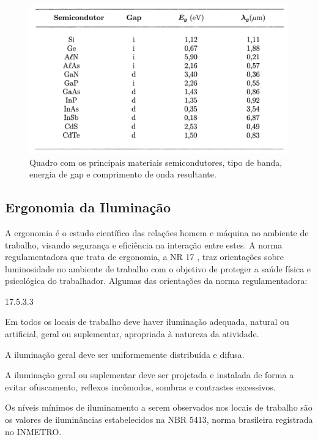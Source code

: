 
\begin{figure}[ht]
    \begin{center}
    \includegraphics{figuras/semic.PNG}
    \end{center}
    \caption[Quadro de energias de gap e comprimentos de onda.]{Quadro com os principais materiais semicondutores, tipo de banda, energia de gap e comprimento de onda resultante.}
    \label{semicon}
\end{figure}

\subsection{Ergonomia da Iluminação}

A ergonomia é o estudo científico das relações homem e máquina no ambiente de trabalho, visando segurança e eficiência na interação entre estes. A norma regulamentadora que trata de ergonomia, a NR 17 \cite{norma}, traz orientações sobre luminosidade no ambiente de trabalho com o objetivo de proteger a saúde física e psicológica do trabalhador. Algumas das orientações da norma regulamentadora:

\begin{labeling}{17.5.3.3}
    \item[17.5.3] Em todos os locais de trabalho deve haver iluminação adequada, natural ou artificial, geral ou suplementar, apropriada à natureza da atividade.
    \item[17.5.3.1]  A iluminação geral deve ser uniformemente distribuída e difusa.
    \item[17.5.3.2] A iluminação geral ou suplementar deve ser projetada e instalada de forma a evitar ofuscamento, reflexos incômodos, sombras e contrastes excessivos.
    \item[17.5.3.3] Os níveis mínimos de iluminamento a serem observados nos locais de trabalho são os valores de iluminâncias estabelecidos na NBR 5413, norma brasileira registrada no INMETRO.
\end{labeling}

